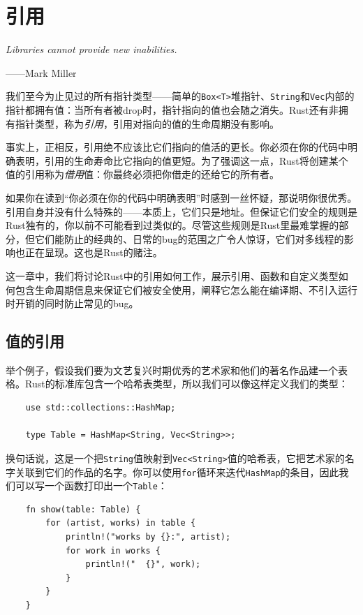 \chapter{引用}\label{ch05}

\emph{Libraries cannot provide new inabilities.}

\begin{flushright}
——Mark Miller
\end{flushright}

我们至今为止见过的所有指针类型——简单的\texttt{Box<T>}堆指针、\texttt{String}和\texttt{Vec}内部的指针都拥有值：当所有者被drop时，指针指向的值也会随之消失。Rust还有非拥有指针类型，称为\emph{引用}，引用对指向的值的生命周期没有影响。

事实上，正相反，引用绝不应该比它们指向的值活的更长。你必须在你的代码中明确表明，引用的生命寿命比它指向的值更短。为了强调这一点，Rust将创建某个值的引用称为\emph{借用}值：你最终必须把你借走的还给它的所有者。

如果你在读到“你必须在你的代码中明确表明”时感到一丝怀疑，那说明你很优秀。引用自身并没有什么特殊的——本质上，它们只是地址。但保证它们安全的规则是Rust独有的，你以前不可能看到过类似的。尽管这些规则是Rust里最难掌握的部分，但它们能防止的经典的、日常的bug的范围之广令人惊讶，它们对多线程的影响也正在显现。这也是Rust的赌注。

这一章中，我们将讨论Rust中的引用如何工作，展示引用、函数和自定义类型如何包含生命周期信息来保证它们被安全使用，阐释它怎么能在编译期、不引入运行时开销的同时防止常见的bug。

\section{值的引用}

举个例子，假设我们要为文艺复兴时期优秀的艺术家和他们的著名作品建一个表格。Rust的标准库包含一个哈希表类型，所以我们可以像这样定义我们的类型：
\begin{verbatim}
    use std::collections::HashMap;

    type Table = HashMap<String, Vec<String>>;
\end{verbatim}

换句话说，这是一个把\texttt{String}值映射到\texttt{Vec<String>}值的哈希表，它把艺术家的名字关联到它们的作品的名字。你可以使用\texttt{for}循环来迭代\texttt{HashMap}的条目，因此我们可以写一个函数打印出一个\texttt{Table}：
\begin{verbatim}
    fn show(table: Table) {
        for (artist, works) in table {
            println!("works by {}:", artist);
            for work in works {
                println!("  {}", work);
            }
        }
    }
\end{verbatim}

